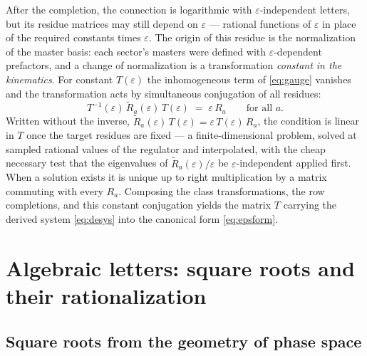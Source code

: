\documentclass[11pt]{article}
\newcommand{\eps}{\varepsilon}
\begin{document}
After the completion, the connection is logarithmic with
$\eps$-independent letters, but its residue matrices may still
depend on $\eps$ --- rational functions of $\eps$ in place of the
required constants times $\eps$.  The origin of this residue is the
normalization of the master basis: each sector's masters were
defined with $\eps$-dependent prefactors, and a change of
normalization is a transformation \emph{constant in the
kinematics}.  For constant $T(\eps)$ the inhomogeneous term of
\eqref{eq:gauge} vanishes and the transformation acts by
simultaneous conjugation of all residues:
\begin{equation}
  T^{-1}(\eps)\, \tilde R_a(\eps)\, T(\eps) \;=\; \eps\, R_a
  \qquad \text{for all } a .
\end{equation}
Written without the inverse, $\tilde R_a(\eps)\,T(\eps) = \eps\,
T(\eps)\,R_a$, the condition is linear in $T$ once the target
residues are fixed --- a finite-dimensional problem, solved at
sampled rational values of the regulator and interpolated, with the
cheap necessary test that the eigenvalues of
$\tilde R_a(\eps)/\eps$ be $\eps$-independent applied first.  When a
solution exists it is unique up to right multiplication by a matrix
commuting with every $R_a$.  Composing the class transformations, the
row completions, and this constant conjugation yields the matrix $T$
carrying the derived system \eqref{eq:desys} into the canonical form
\eqref{eq:epsform}.

\section{Algebraic letters: square roots and their rationalization}
\label{sec:roots}

\subsection{Square roots from the geometry of phase space}
\end{document}
